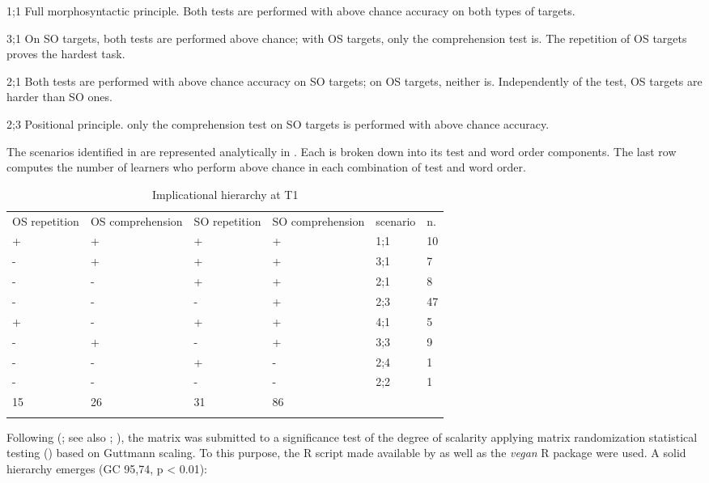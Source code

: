 1;1  Full morphosyntactic principle. Both tests are performed with above chance accuracy on both types of targets.

3;1  On SO targets, both tests are performed above chance; with OS targets, only the comprehension test is. The repetition of OS targets proves the hardest task.

2;1  Both tests are performed with above chance accuracy on SO targets; on OS targets, neither is. Independently of the test, OS targets are harder than SO ones.

2;3  Positional principle. only the comprehension test on SO targets is performed with above chance accuracy. 

The scenarios identified in  are represented analytically in . Each is broken down into its test and word order components. The last row computes the number of learners who perform above chance in each combination of test and word order. 

\begin{table}
    \begin{tabularx}{\textwidth}{XXXXXX}
        \lsptoprule
        OS repetition & OS comprehension & SO repetition & SO comprehension & scenario & n. \\
         + & + & + & + & 1;1 & 10\\
         {}- & + & + & + & 3;1 & 7\\
         {}- & {}- & + & + & 2;1 & 8\\
         {}- & {}- & {}- & + & 2;3 & 47\\
         + & {}- & + & + & 4;1 & 5\\
         {}- & + & {}- & + & 3;3 & 9\\
         {}- & {}- & + & {}- & 2;4 & 1\\
         {}- & {}- & {}- & {}- & 2;2 & 1\\
         15 & 26 & 31 & 86 &  & \\
        \lspbottomrule
    \end{tabularx}
    \caption{Implicational hierarchy at T1}
    \label{tab:06:4}
\end{table}

Following \citeauthor{AldaiWichmann2018} (\citeyear{AldaiWichmann2018}; see also \citealt{Nyqvist2018, Wichmann2015, Wichmann2016}; \citealt[210-212]{HatchLazaraton1991}), the matrix was submitted to a significance test of the degree of scalarity applying matrix randomization statistical testing (\citealt{JanssenEtAl2006}) based on Guttmann scaling. To this purpose, the R script made available by \citet{AldaiWichmann2018} as well as the \textit{vegan} R package \citep{OksanenEtAl2019} were used. A solid hierarchy emerges (GC 95,74, p < 0.01): 

